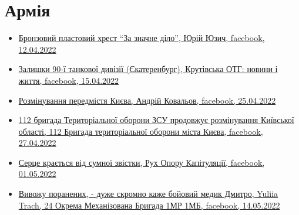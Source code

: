  
 
 
 
 
\section{Армія}
\label{sec:topics.vojna.armia}





\begin{itemize} %

\item \hyperlink{12_04_2022.fb.juzych_jurij.1.plast_krest_nagrada}{%
Бронзовий пластовий хрест \enquote{За значне діло}, Юрій Юзич, facebook, 12.04.2022%
}



\item \hyperlink{15_04_2022.fb.krutivska_otg.1.zalyshky_divizii_ekaterinburg}{%
Залишки 90-ї танкової дивізії (Єкатеренбург), Крутівська ОТГ: новини і життя, %
facebook, 15.04.2022%
}

\item \hyperlink{25_04_2022.fb.kovalov_andrij.1.razminirovanie_predmestij_kieva}{%
Розмінування передмістя Києва, Андрій Ковальов, facebook, 25.04.2022%
}

\item \hyperlink{27_04_2022.fb.teroborona_ua.kiev.112.br.1.rozminuvannja_kiev_obl}{%
112 бригада Територіальної оборони ЗСУ продовжує розмінування Київської області, %
112 Бригада територіальної оборони міста Києва, facebook, 27.04.2022%
}

\item \hyperlink{01_05_2022.fb.fb_group.ruh_oporu_kapituljacii.1.smert_ruslan_borovik}{%
Серце крається від сумної звістки, Рух Опору Капітуляції, facebook, 01.05.2022%
}

\item \hyperlink{14_05_2022.fb.fb_group.ua.armia.24_ombr.1mp.1mb.1.medik}{%
Вивожу поранених, - дуже скромно каже бойовий медик Дмитро, Yuliia Trach, 24 Окрема Механізована Бригада 1МР 1МБ, %
facebook, 14.05.2022%
}

\end{itemize} %
